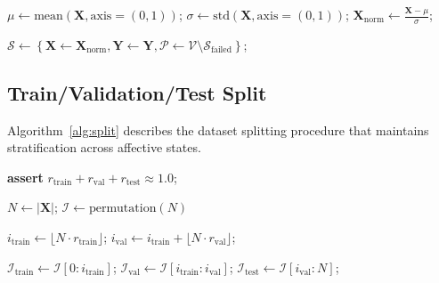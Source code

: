\documentclass{article}
\begin{document}
\begin{algorithm}[H]

\BlankLine
{}
$\mu \leftarrow \text{mean}(\mathbf{X}, \text{axis}=(0, 1))$;
$\sigma \leftarrow \text{std}(\mathbf{X}, \text{axis}=(0, 1))$;
$\mathbf{X}_{\text{norm}} \leftarrow \frac{\mathbf{X} - \mu}{\sigma}$;

\BlankLine
{}
$\mathcal{S} \leftarrow \left\{
    \mathbf{X} \leftarrow \mathbf{X}_{\text{norm}},
    \mathbf{Y} \leftarrow \mathbf{Y},
    \mathcal{P} \leftarrow \mathcal{V} \setminus \mathcal{S}_{\text{failed}}
\right\}$;

\BlankLine
{}
\end{algorithm}

\subsection{Train/Validation/Test Split}

Algorithm~\ref{alg:split} describes the dataset splitting procedure that maintains stratification across affective states.

\begin{algorithm}[H]
\caption{Dataset Splitting}
\label{alg:split}

\BlankLine
{}
\textbf{assert} $r_{\text{train}} + r_{\text{val}} + r_{\text{test}} \approx 1.0$;

\BlankLine
$N \leftarrow |\mathbf{X}|$;
$\mathcal{I} \leftarrow \text{permutation}(N)$ 

\BlankLine
{}
$i_{\text{train}} \leftarrow \lfloor N \cdot r_{\text{train}} \rfloor$;
$i_{\text{val}} \leftarrow i_{\text{train}} + \lfloor N \cdot r_{\text{val}} \rfloor$;

\BlankLine
$\mathcal{I}_{\text{train}} \leftarrow \mathcal{I}[0 : i_{\text{train}}]$;
$\mathcal{I}_{\text{val}} \leftarrow \mathcal{I}[i_{\text{train}} : i_{\text{val}}]$;
$\mathcal{I}_{\text{test}} \leftarrow \mathcal{I}[i_{\text{val}} : N]$;

\BlankLine
{}
\end{algorithm}
\end{document}
